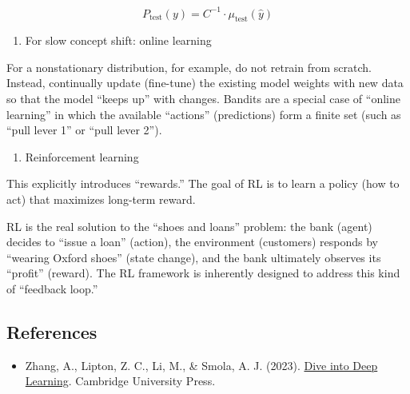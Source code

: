 \[
P_{\mathrm{test}}(y)=C^{-1}\cdot\mu_{\mathrm{test}}(\hat{y})
\]

\begin{enumerate}
\def\labelenumi{\arabic{enumi}.}
\setcounter{enumi}{2}
\tightlist
\item
  For slow concept shift: online learning
\end{enumerate}

For a nonstationary distribution, for example, do not retrain from scratch. Instead, continually update (fine-tune) the existing model weights with new data so that the model ``keeps up'' with changes. Bandits are a special case of ``online learning'' in which the available ``actions'' (predictions) form a finite set (such as ``pull lever 1'' or ``pull lever 2'').

\begin{enumerate}
\def\labelenumi{\arabic{enumi}.}
\setcounter{enumi}{3}
\tightlist
\item
  Reinforcement learning
\end{enumerate}

This explicitly introduces ``rewards.'' The goal of RL is to learn a policy (how to act) that maximizes long-term reward.

RL is the real solution to the ``shoes and loans'' problem: the bank (agent) decides to ``issue a loan'' (action), the environment (customers) responds by ``wearing Oxford shoes'' (state change), and the bank ultimately observes its ``profit'' (reward). The RL framework is inherently designed to address this kind of ``feedback loop.''

\FloatBarrier
{}
\hypertarget{references-10}{%
\subsection{References}\label{references-10}}

\vspace{0.25em}
\begin{itemize}
\tightlist
\item
  Zhang, A., Lipton, Z. C., Li, M., \& Smola, A. J. (2023). \href{https://D2L.ai}{Dive into Deep Learning}. Cambridge University Press.
\end{itemize}

\clearpage
